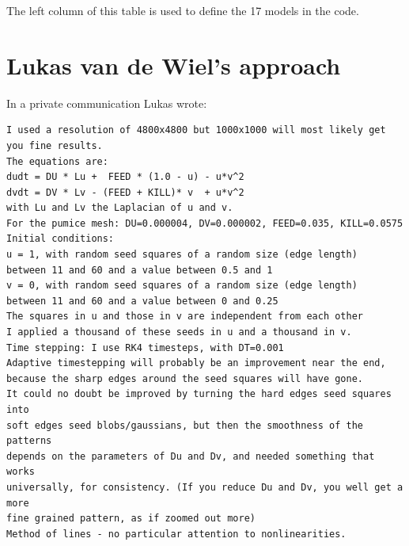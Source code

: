 The left column of this table is used to define the 17 
models in the code.

\section*{Lukas van de Wiel's approach}

In a private communication Lukas wrote:
{\small 
\begin{verbatim}
I used a resolution of 4800x4800 but 1000x1000 will most likely get you fine results.
The equations are:
dudt = DU * Lu +  FEED * (1.0 - u) - u*v^2
dvdt = DV * Lv - (FEED + KILL)* v  + u*v^2
with Lu and Lv the Laplacian of u and v.
For the pumice mesh: DU=0.000004, DV=0.000002, FEED=0.035, KILL=0.0575
Initial conditions:
u = 1, with random seed squares of a random size (edge length) 
between 11 and 60 and a value between 0.5 and 1
v = 0, with random seed squares of a random size (edge length) 
between 11 and 60 and a value between 0 and 0.25
The squares in u and those in v are independent from each other
I applied a thousand of these seeds in u and a thousand in v.
Time stepping: I use RK4 timesteps, with DT=0.001
Adaptive timestepping will probably be an improvement near the end,  
because the sharp edges around the seed squares will have gone.
It could no doubt be improved by turning the hard edges seed squares into 
soft edges seed blobs/gaussians, but then the smoothness of the patterns
depends on the parameters of Du and Dv, and needed something that works 
universally, for consistency. (If you reduce Du and Dv, you well get a more 
fine grained pattern, as if zoomed out more) 
Method of lines - no particular attention to nonlinearities. 
\end{verbatim}
}

